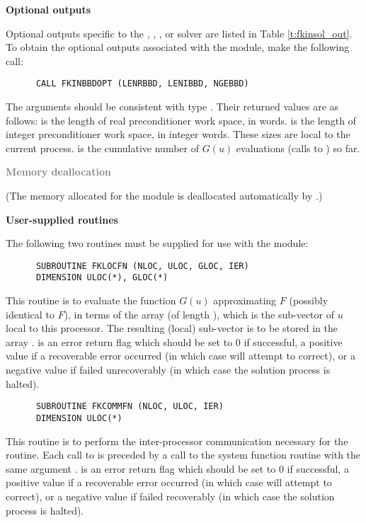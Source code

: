 \begin{Steps}
\item {\bf {\kinbbdpre} Optional outputs}

  Optional outputs specific to the {\spgmr}, {\spfgmr}, {\spbcg}, or {\sptfqmr} solver are
  listed in Table \ref{t:fkinsol_out}.
  To obtain the optional outputs associated with the {\kinbbdpre} module, make
  the following call:
\begin{verbatim}
      CALL FKINBBDOPT (LENRBBD, LENIBBD, NGEBBD)
\end{verbatim}
  The arguments should be consistent with {\C} type .  Their
  returned values are as follows:
   is the length of real preconditioner work space, in 
  words.  is the length of integer preconditioner work space, in
  integer words. These sizes are local to the current process.
   is the cumulative number of $G(u)$ evaluations (calls to )
  so far.
  
\item \textcolor{gray}{\bf Memory deallocation}

  (The memory allocated for the {\fkinbbd} module is deallocated automatically
  by .)

\item {\bf User-supplied routines}

  The following two routines must be supplied for use with the {\kinbbdpre}
  module:
\begin{verbatim}
      SUBROUTINE FKLOCFN (NLOC, ULOC, GLOC, IER)
      DIMENSION ULOC(*), GLOC(*)
\end{verbatim}
  This routine is to evaluate the function $G(u)$ approximating $F$
  (possibly identical to $F$), in terms of the array
   (of length ), which is the sub-vector
  of $u$ local to this processor.  The resulting (local) sub-vector
  is to be stored in the array .
   is an error return flag which should be set to $0$ if successful,
  a positive value if a recoverable error occurred (in which case {\kinsol} will
  attempt to correct), or a negative value if  failed unrecoverably
  (in which case the solution process is halted).

\begin{verbatim}
      SUBROUTINE FKCOMMFN (NLOC, ULOC, IER)
      DIMENSION ULOC(*)
\end{verbatim}
  This routine is to perform the inter-processor communication necessary
  for the  routine.
  Each call to  is preceded by a call to the system function
  routine  with the same argument .
   is an error return flag which should be set to $0$ if successful,
  a positive value if a recoverable error occurred (in which case {\kinsol} will
  attempt to correct), or a negative value if  failed recoverably
  (in which case the solution process is halted).


\end{Steps}
